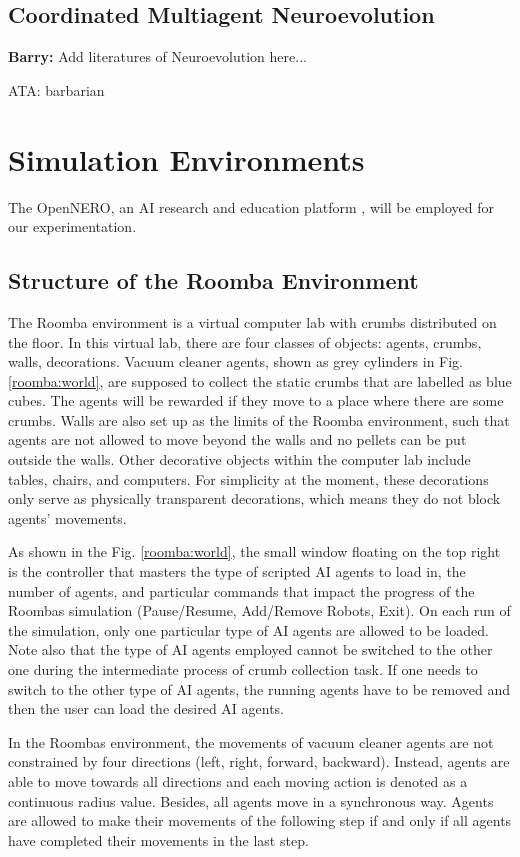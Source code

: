 \documentclass[conference]{IEEEtran}
\begin{document}
\subsection{Coordinated Multiagent Neuroevolution}
\textbf{Barry:}
Add literatures of Neuroevolution here...

ATA: barbarian


\section{Simulation Environments}
The OpenNERO, an AI research and education platform
\cite{karpov2008opennero}, will be employed for our experimentation.

\subsection{Structure of the Roomba Environment}
The Roomba environment is a virtual computer lab with crumbs distributed on
the floor.
In this virtual lab, there are four classes of objects: agents, crumbs, walls,
decorations. 
Vacuum cleaner agents, shown as grey cylinders in Fig. \ref{roomba:world}, are
supposed to collect the static crumbs that are labelled as blue cubes.  
The agents will be rewarded if they move to a place where there are some
crumbs. 
Walls are also set up as the limits of the Roomba environment, such that
agents are not allowed to move beyond the walls and no pellets can be put
outside the walls.
Other decorative objects within the computer lab include tables, chairs, and
computers. For simplicity at the moment, these decorations only serve as
physically transparent decorations, which means they do not block agents' movements.

As shown in the Fig. \ref{roomba:world}, the small window floating on the top right
is the controller that masters the type of scripted AI agents to load in, the
number of agents, and particular commands that impact the progress of the
Roombas simulation (Pause/Resume, Add/Remove Robots, Exit). On each run of the
simulation, only one particular type of AI agents are allowed to be loaded.
Note also that the type of AI agents employed cannot be switched to the other
one during the intermediate process of crumb collection task. 
If one needs to switch to the other type of AI agents, the running agents have
to be removed and then the user can load the desired AI agents.

In the Roombas environment, the movements of vacuum cleaner agents are not
constrained by four directions (left, right, forward, backward). Instead,
agents are able to move towards all directions and each moving action is
denoted as a continuous radius value. Besides, all agents move in a
synchronous way. Agents are allowed to make their movements of the following
step if and only if all agents have completed their movements in the last step.
\end{document}
